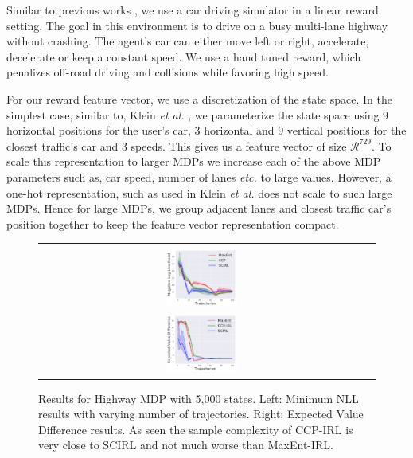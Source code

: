 \documentclass{article}
\def\MSHangBox#1{%
\begin{minipage}[t]{\textwidth}%
\begin{tabbing} %
~\\[-\baselineskip] %
#1 %
\end{tabbing}%
\end{minipage}} %
\begin{document}

Similar to previous works \cite{abbeel2004apprenticeship, klein2012inverse}, we use a car driving simulator in a linear reward setting. The goal in this environment is to drive on a busy multi-lane highway without crashing. The agent's car can either move left or right, accelerate, decelerate or keep a constant speed. We use a hand tuned reward, which penalizes off-road driving and collisions while favoring high speed. 

For our reward feature vector, we use a discretization of the state space. In the simplest case, similar to, Klein \emph{et al.} , we parameterize the state space using 9 horizontal positions for the user's car, 3 horizontal and 9 vertical positions for the closest traffic's car and 3 speeds. This gives us a feature vector of size $\mathcal{R}^{729}$. To scale this representation to larger MDPs we increase each of the above MDP parameters such as, car speed, number of lanes \emph{etc.} to large values. However, a one-hot representation, such as used in Klein \emph{et al.} does not scale to such large MDPs. Hence for large MDPs, we group adjacent lanes and closest traffic car's position together to keep the feature vector representation compact.

\begin{figure}[t]
\centering
  \begin{tabular}{cc}
    \MSHangBox{\includegraphics[width=0.22\textwidth]{images/highway/medium_mdp/test_nll.pdf}}&
    \MSHangBox{\includegraphics[width=0.22\textwidth]{images/highway/medium_mdp/test_evd.pdf}}
    \end{tabular}
    \caption{Results for Highway MDP with 5,000 states. Left: Minimum NLL results with varying number of trajectories. Right: Expected Value Difference results. As seen the sample complexity of CCP-IRL is very close to SCIRL and not much worse than MaxEnt-IRL.}
    \label{fig:img_maxent_vs_ccp_gridworld_macro_cell}
\end{figure}
\end{document}
